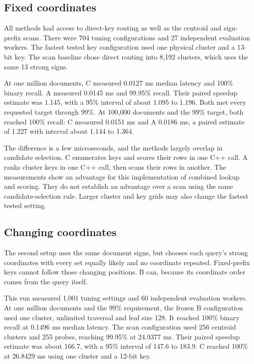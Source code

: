 \subsection{Fixed coordinates}
All methods had access to direct-key routing as well as the centroid and sign-prefix scans.
There were 704 tuning configurations and 27 independent evaluation workers. The fastest tested
key configuration used one physical cluster and a 13-bit key. The scan baseline chose direct
routing into 8,192 clusters, which uses the same 13 strong signs.

At one million documents, C measured 0.0127 ms median latency and 100\% binary recall. A
measured 0.0145 ms and 99.95\% recall. Their paired speedup estimate was 1.145, with a 95\%
interval of about 1.095 to 1.196. Both met every requested target through 99\%.
At 100,000 documents and the 99\% target, both reached 100\% recall: C measured 0.0151 ms
and A 0.0186 ms, a paired estimate of 1.227 with interval about 1.144 to 1.364.

The difference is a few microseconds, and the methods largely overlap in candidate selection.
C enumerates keys and scores their rows in one C++ call. A ranks cluster keys in one C++
call, then scans their rows in another. The measurements show an advantage for this implementation of combined lookup and scoring.
They do not establish an advantage over a scan using the same candidate-selection rule. Larger cluster and key grids may also
change the fastest tested setting.

\subsection{Changing coordinates}
The second setup uses the same document signs, but chooses each query's strong coordinates
with every set equally likely and no coordinate repeated. Fixed-prefix keys cannot follow those changing positions.
B can, because its coordinate order comes from the query itself.

This run measured 1,001 tuning settings and 60 independent evaluation workers. At one million
documents and the 99\% requirement, the frozen B configuration used one cluster, unlimited
traversal and leaf size 128. It reached 100\% binary recall at 0.1496 ms median latency.
The scan configuration used 256 centroid clusters and 255 probes, reaching 99.95\% at
24.9377 ms. Their paired speedup estimate was about 166.7, with a 95\% interval of
147.6 to 183.9. C reached 100\% at 26.8429 ms using one cluster and a 12-bit key.

